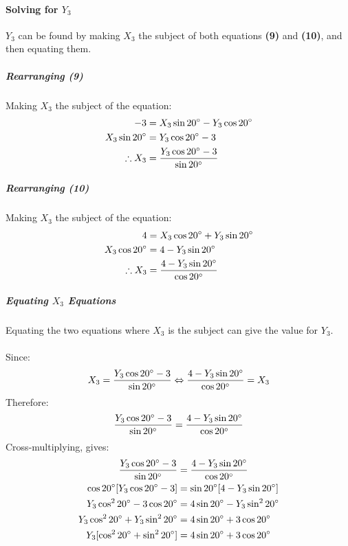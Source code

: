 \documentclass{article}
\begin{document}
            \paragraph{Solving for $Y_3$} $Y_3$ can be found by making $X_3$ the subject of both equations \textbf{(9)} and \textbf{(10)}, and then equating them.
            \subparagraph{Rearranging (9)} Making $X_3$ the subject of the equation:
            \begin{align*}
            -3 &= X_3\sin{20\degree} - Y_3\cos{20\degree} \\
            X_3\sin{20\degree} &= Y_3\cos{20\degree} - 3 \\
            \therefore X_3 &= \frac{Y_3\cos{20\degree} - 3}{\sin{20\degree}}
            \end{align*}
            \subparagraph{Rearranging (10)} Making $X_3$ the subject of the equation:
            \begin{align*}
            4 &= X_3\cos{20\degree} + Y_3\sin{20\degree} \\
            X_3\cos{20\degree} &= 4 - Y_3\sin{20\degree} \\
            \therefore X_3 &= \frac{4 - Y_3\sin{20\degree}}{\cos{20\degree}}
            \end{align*}
            \subparagraph{Equating $X_3$ Equations} Equating the two equations where $X_3$ is the subject can give the value for $Y_3$. \\\\ 
            Since:
            \begin{equation*}
                X_3 = \frac{Y_3\cos{20\degree} - 3}{\sin{20\degree}} \Leftrightarrow \frac{4 - Y_3\sin{20\degree}}{\cos{20\degree}} = X_3
            \end{equation*}
            Therefore:
            \begin{equation*}
               \frac{Y_3\cos{20\degree} - 3}{\sin{20\degree}} = \frac{4 - Y_3\sin{20\degree}}{\cos{20\degree}}
            \end{equation*}
            Cross-multiplying, gives:
            \begin{align*}
                \frac{Y_3\cos{20\degree} - 3}{\sin{20\degree}} &= \frac{4 - Y_3\sin{20\degree}}{\cos{20\degree}} \\
                \cos{20\degree}[Y_3\cos{20\degree} - 3] &= \sin{20\degree}[4 - Y_3\sin{20\degree}] \\
                Y_3\cos^2{20\degree} - 3\cos{20\degree} &= 4\sin{20\degree} - Y_3\sin^2{20\degree} \\
                Y_3\cos^2{20\degree} + Y_3\sin^2{20\degree} &= 4\sin{20\degree} + 3\cos{20\degree} \\
                Y_3[\cos^2{20\degree} + \sin^2{20\degree}] &= 4\sin{20\degree} + 3\cos{20\degree}
            \end{align*}
\end{document}
